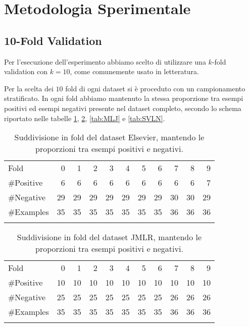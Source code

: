 \section{Metodologia Sperimentale}


\subsection{10-Fold Validation}

Per l'esecuzione dell'esperimento abbiamo scelto di utilizzare una $k$-fold validation con $k=10$, come comunemente usato in letteratura. \cite{wiki:kfold}

Per la scelta dei $10$ fold di ogni dataset si è proceduto con un campionamento stratificato\cite{wiki:StratifiedSampling}. In ogni fold abbiamo mantenuto la stessa proporzione tra esempi positivi ed esempi negativi presente nel dataset completo, secondo lo schema riportato nelle tabelle  \ref{tab:Elsevier}, \ref{tab:JMLR}, \ref{tab:MLJ} e \ref{tab:SVLN}.

\begin{table}[H]
	\centering
		\begin{tabular}{l@{\qquad}*{10}{r}}
		\toprule
\addlinespace
			Fold &  0 &  1 &  2 &  3 &  4 &  5 &  6 &  7 &  8 &  9 \\
\addlinespace
\midrule
\addlinespace
\#Positive  & 6  & 6  &  6 &  6 &  6 &  6 &  6 &  6 &  6 &  7 \\
\#Negative  & 29 & 29 & 29 & 29 & 29 & 29 & 29 & 30 & 30 & 29 \\
\#Examples & 35 & 35 & 35 & 35 & 35 & 35 & 35 & 36 & 36 & 36 \\
\addlinespace
\bottomrule
		\end{tabular}
		\caption[Elsevier: suddivisione in fold.]{Suddivisione in fold del dataset Elsevier, mantendo le proporzioni tra esempi positivi e negativi.}
	\label{tab:Elsevier}
\end{table}

\begin{table}[H]
\centering
\begin{tabular}{l@{\qquad}*{10}{r}}
		\toprule
\addlinespace
Fold &  0 &  1 &  2 &  3 &  4 &  5 &  6 &  7 &  8 &  9 \\
\addlinespace
\midrule
\addlinespace
\#Positive  & 10  & 10  &  10 &  10 &  10 &  10 &  10 &  10 &  10 &  10 \\
\#Negative  & 25 & 25 & 25 & 25 & 25 & 25 & 25 & 26 & 26 & 26 \\
\#Examples  & 35 & 35 & 35 & 35 & 35 & 35 & 35 & 36 & 36 & 36 \\
\addlinespace
\bottomrule
\end{tabular}
		\caption[JMLR: suddivisione in fold.]{Suddivisione in fold del dataset JMLR, mantendo le proporzioni tra esempi positivi e negativi.}
	\label{tab:JMLR}
\end{table}


